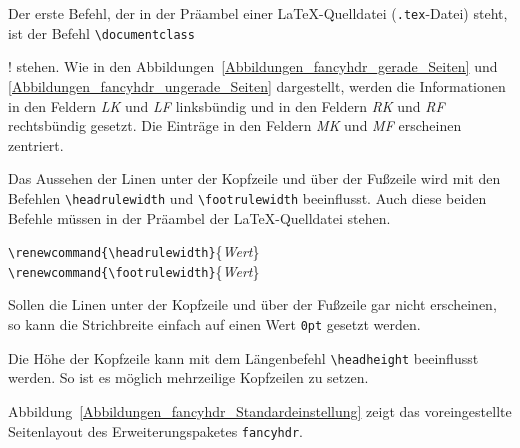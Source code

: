 Der erste Befehl, der in der Präambel einer \LaTeX-Quelldatei (\verb!.tex!-Datei) steht, ist der Befehl \verb!\documentclass!
\begin{document}
! stehen. Wie in den Abbildungen~\ref{Abbildungen_fancyhdr_gerade_Seiten} und \ref{Abbildungen_fancyhdr_ungerade_Seiten} dargestellt, werden die Informationen in den Feldern \textsl{LK} und \textsl{LF} linksbündig und in den Feldern \textsl{RK} und \textsl{RF} rechtsbündig gesetzt. Die Einträge in den Feldern \textsl{MK} und \textsl{MF} erscheinen zentriert. 


Das Aussehen der Linen unter der Kopfzeile und über der Fußzeile wird mit den 
Befehlen \verb!\headrulewidth!
und \verb!\footrulewidth! 
beeinflusst. Auch diese beiden Befehle müssen in der Präambel der \LaTeX-Quelldatei stehen.


\begin{boxedminipage}{\textwidth}
\texttt{\textbackslash renewcommand\{\textbackslash headrulewidth\}}\{\textsl{Wert}\} \\
\texttt{\textbackslash renewcommand\{\textbackslash footrulewidth\}}\{\textsl{Wert}\} 
\end{boxedminipage}

Sollen die Linen unter der Kopfzeile und über der Fußzeile gar nicht erscheinen, so kann die Strichbreite einfach auf einen Wert \verb!0pt! gesetzt werden.

Die Höhe der Kopfzeile kann mit dem Längenbefehl \verb!\headheight! 
beeinflusst werden. So ist es möglich mehrzeilige Kopfzeilen zu setzen.




Abbildung~\ref{Abbildungen_fancyhdr_Standardeinstellung} zeigt das voreingestellte Seitenlayout des Erweiterungspaketes \verb!fancyhdr!.
\end{document}
